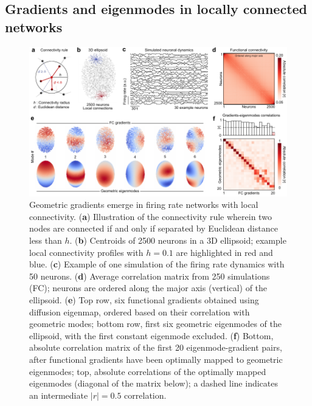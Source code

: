 \documentclass{article}
\begin{document}
\subsection*{Gradients and eigenmodes in locally connected networks}

\begin{figure}[t]
    \centering
    \includegraphics[width=1.0\linewidth]{figures/figure1.pdf}
    \caption{Geometric gradients emerge in firing rate networks with local connectivity. (\textbf{a}) Illustration of the connectivity rule wherein two nodes are connected if and only if separated by Euclidean distance less than $h$. (\textbf{b}) Centroids of 2500 neurons in a 3D ellipsoid; example local connectivity profiles with $h=0.1$ are highlighted in red and blue. (\textbf{c}) Example of one simulation of the firing rate dynamics with 50 neurons. (\textbf{d}) Average correlation matrix from 250 simulations (FC); neurons are ordered along the major axis (vertical) of the ellipsoid. (\textbf{e}) Top row, six functional gradients obtained using diffusion eigenmap, ordered based on their correlation with geometric modes; bottom row, first six geometric eigenmodes of the ellipsoid, with the first constant eigenmode excluded. (\textbf{f}) Bottom, absolute correlation matrix of the first 20 eigenmode-gradient pairs, after functional gradients have been optimally mapped to geometric eigenmodes; top, absolute correlations of the optimally mapped eigenmodes (diagonal of the matrix below); a dashed line indicates an intermediate $|r|=0.5$ correlation.}
    \label{fig1}
    \hrulefill
\end{figure}
\end{document}
